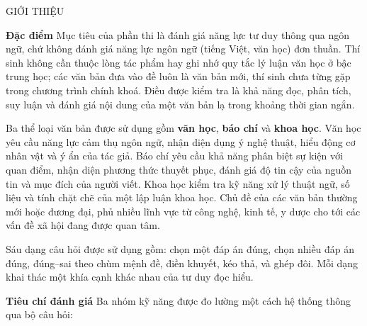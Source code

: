 \documentclass[12pt,a4paper,twoside]{article}
\begin{document}
\begin{sectionheader}{GIỚI THIỆU}

\textbf{\textcolor{primaryBlue}{Đặc điểm}}
\vspace{2pt}
Mục tiêu của phần thi là đánh giá năng lực tư duy thông qua ngôn ngữ, chứ không đánh giá năng lực ngôn ngữ (tiếng Việt, văn học) đơn thuần. Thí sinh không cần thuộc lòng tác phẩm hay ghi nhớ quy tắc lý luận văn học ở bậc trung học; các văn bản đưa vào đề luôn là văn bản mới, thí sinh chưa từng gặp trong chương trình chính khoá. Điều được kiểm tra là khả năng đọc, phân tích, suy luận và đánh giá nội dung của một văn bản lạ trong khoảng thời gian ngắn.

\vspace{2pt}
Ba thể loại văn bản được sử dụng gồm \textbf{văn học}, \textbf{báo chí} và \textbf{khoa học}. Văn học yêu cầu năng lực cảm thụ ngôn ngữ, nhận diện dụng ý nghệ thuật, hiểu động cơ nhân vật và ý ẩn của tác giả. Báo chí yêu cầu khả năng phân biệt sự kiện với quan điểm, nhận diện phương thức thuyết phục, đánh giá độ tin cậy của nguồn tin và mục đích của người viết. Khoa học kiểm tra kỹ năng xử lý thuật ngữ, số liệu và tính chặt chẽ của một lập luận khoa học. Chủ đề của các văn bản thường mới hoặc đương đại, phủ nhiều lĩnh vực từ công nghệ, kinh tế, y dược cho tới các vấn đề xã hội đang được quan tâm.

\vspace{2pt}
Sáu dạng câu hỏi được sử dụng gồm: chọn một đáp án đúng, chọn nhiều đáp án đúng, đúng--sai theo chùm mệnh đề, điền khuyết, kéo thả, và ghép đôi. Mỗi dạng khai thác một khía cạnh khác nhau của tư duy đọc hiểu.

\vspace{8pt}
\textbf{\textcolor{primaryBlue}{Tiêu chí đánh giá}}
\vspace{2pt}
Ba nhóm kỹ năng được đo lường một cách hệ thống thông qua bộ câu hỏi:


\end{sectionheader}
\end{document}
